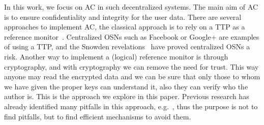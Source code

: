 In this work, we focus on \ac{AC} in such decentralized systems.
The main aim of \ac{AC} is to ensure confidentiality and integrity for the user 
data.
There are several approaches to implement \ac{AC}, the classical approach is to 
rely on a \ac{TTP} as a reference monitor~\cite{AccessControl}.
Centralized \acp{OSN} such as Facebook or Google+ are examples of using 
a \ac{TTP}, and the Snowden revelations~\cite{prism} have proved centralized 
\acp{OSN} a risk.
Another way to implement a (logical) reference monitor is through cryptography, 
and with cryptography we can remove the need for trust.
This way anyone may read the encrypted data and we can be sure that only those 
to whom we have given the proper keys can understand it, also they can verify 
who the author is.
This is the approach we explore in this paper.
Previous research has already identified many pitfalls in this approach, 
e.g.~\cite{DevilInMetadata}, thus the purpose is not to find pitfalls, but to 
find efficient mechanisms to avoid them.

%


